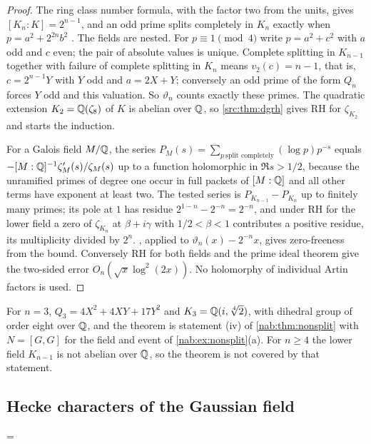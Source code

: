 \begin{proof}
The ring class number formula, with the factor two from the units, gives $[K_n:K]=2^{n-1}$, and an odd
prime splits completely in $K_n$ exactly when $p=a^2+2^{2n}b^2$ \cite[\S\S7, 9]{Cox2013Primes}. The fields
are nested. For $p\equiv1\pmod4$ write $p=a^2+c^2$ with $a$ odd and $c$ even; the pair of absolute values
is unique. Complete splitting in $K_{n-1}$ together with failure of complete splitting in $K_n$ means
$v_2(c)=n-1$, that is, $c=2^{n-1}Y$ with $Y$ odd and $a=2X+Y$; conversely an odd prime of the form $Q_n$
forces $Y$ odd and this valuation. So $\vartheta_n$ counts exactly these primes. The quadratic extension
$K_2=\mathbb{Q}(\zeta_8)$ of $K$ is abelian over $\mathbb{Q}$, so \cref{src:thm:dgrh} gives RH for $\zeta_{K_2}$ and starts
the induction.

For a Galois field $M/\mathbb{Q}$, the series $P_M(s)=\sum_{p\ \text{split completely}}(\log p)p^{-s}$ equals
$-[M:\mathbb{Q}]^{-1}\zeta_M'(s)/\zeta_M(s)$ up to a function holomorphic in $\Re s>1/2$, because the unramified
primes of degree one occur in full packets of $[M:\mathbb{Q}]$ and all other terms have exponent at least two. The
tested series is $P_{K_{n-1}}-P_{K_n}$ up to finitely many primes; its pole at $1$ has residue
$2^{1-n}-2^{-n}=2^{-n}$, and under RH for the lower field a zero of $\zeta_{K_n}$ at $\beta+i\gamma$ with
$1/2<\beta<1$ contributes a positive residue, its multiplicity divided by $2^n$. ,
applied to $\vartheta_n(x)-2^{-n}x$, gives zero-freeness from the bound. Conversely RH for both fields and
the prime ideal theorem give the two-sided error $O_n(\sqrt x\log^2(2x))$. No holomorphy of individual
Artin factors is used.
\end{proof}

For $n=3$, $Q_3=4X^2+4XY+17Y^2$ and $K_3=\mathbb{Q}(i,\sqrt[4]2)$, with dihedral group of order eight over $\mathbb{Q}$,
and the theorem is statement (iv) of \cref{nab:thm:nonsplit} with $N=[G,G]$ for the field and event of
\cref{nab:ex:nonsplit}(a). For $n\ge4$ the lower field $K_{n-1}$ is not abelian over $\mathbb{Q}$, so the theorem
is not covered by that statement.

\subsection{Hecke characters of the Gaussian field}\label{hec:ss:gaussian}
{\emergencystretch=\textwidth{}}

